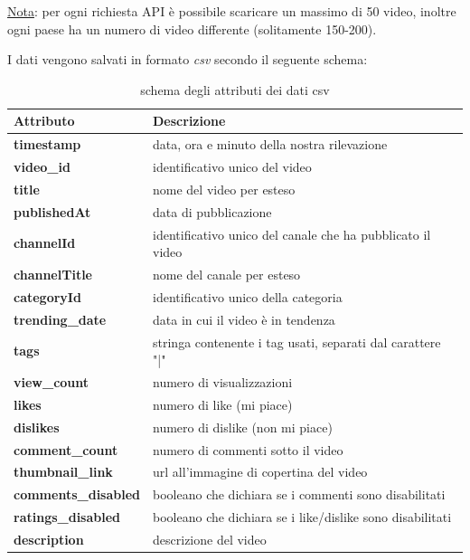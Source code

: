 \underline{Nota}: per ogni richiesta API è possibile scaricare un massimo di 50 video, inoltre ogni paese ha un numero di video differente (solitamente 150-200).

I dati vengono salvati in formato \textit{csv} secondo il seguente schema:
\begin{table}[H]
	\centering
	\begin{tabular}{l|l}
		\textbf{Attributo} & \textbf{Descrizione} \\
		\hline
		\textbf{timestamp} & data, ora e minuto della nostra rilevazione \\\hline
		\textbf{video\_id} & identificativo unico del video\\\hline
		\textbf{title} & nome del video per esteso\\\hline
		\textbf{publishedAt} & data di pubblicazione\\\hline
		\textbf{channelId} & identificativo unico del canale che ha pubblicato il video\\\hline
		\textbf{channelTitle} & nome del canale per esteso\\\hline
		\textbf{categoryId} & identificativo unico della categoria\\\hline
		\textbf{trending\_date} & data in cui il video è in tendenza\\\hline
		\textbf{tags} & stringa contenente i tag usati, separati dal carattere "|"\\\hline
		\textbf{view\_count} & numero di visualizzazioni\\\hline
		\textbf{likes} & numero di like (mi piace)\\\hline
		\textbf{dislikes} & numero di dislike (non mi piace)\\\hline
		\textbf{comment\_count} & numero di commenti sotto il video\\\hline
		\textbf{thumbnail\_link} & url all'immagine di copertina del video\\\hline
		\textbf{comments\_disabled} & booleano che dichiara se i commenti sono disabilitati\\\hline
		\textbf{ratings\_disabled} & booleano che dichiara se i like/dislike sono disabilitati\\\hline
		\textbf{description} & descrizione del video\\
		\hline
	\end{tabular}
	\caption{schema degli attributi dei dati csv}
\end{table}

